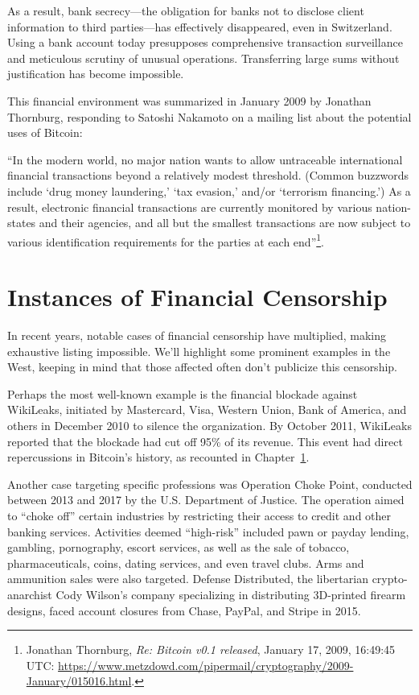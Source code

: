 \documentclass[
  a5paper,
  smalldemyvopaper,10pt,twoside,onecolumn,openright,extrafontsizes,hidelinks]{memoir}
\begin{document}
As a result, bank secrecy---the obligation for banks not to disclose
client information to third parties---has effectively disappeared, even
in Switzerland. Using a bank account today presupposes comprehensive
transaction surveillance and meticulous scrutiny of unusual operations.
Transferring large sums without justification has become impossible.

This financial environment was summarized in January 2009 by Jonathan
Thornburg, responding to Satoshi Nakamoto on a mailing list about the
potential uses of Bitcoin:

``In the modern world, no major nation wants to allow untraceable
international financial transactions beyond a relatively modest
threshold. (Common buzzwords include `drug money laundering,' `tax
evasion,' and/or `terrorism financing.') As a result, electronic
financial transactions are currently monitored by various nation-states
and their agencies, and all but the smallest transactions are now
subject to various identification requirements for the parties at each
end''\footnote{Jonathan Thornburg, \emph{Re: Bitcoin v0.1 released},
  January 17, 2009, 16:49:45 UTC:
  \url{https://www.metzdowd.com/pipermail/cryptography/2009-January/015016.html}.}.

\section*{Instances of Financial
Censorship}\label{les-cas-de-censure-financiuxe8re}


In recent years, notable cases of financial censorship have multiplied,
making exhaustive listing impossible. We'll highlight some prominent
examples in the West, keeping in mind that those affected often don't
publicize this censorship.

Perhaps the most well-known example is the financial blockade against
WikiLeaks, initiated by Mastercard, Visa, Western Union, Bank of
America, and others in December 2010 to silence the organization. By
October 2011, WikiLeaks reported that the blockade had cut off 95\% of
its revenue. This event had direct repercussions in Bitcoin's history,
as recounted in Chapter~\hyperref[ch:mythe]{1}.

Another case targeting specific professions was Operation Choke Point,
conducted between 2013 and 2017 by the U.S. Department of Justice. The
operation aimed to ``choke off'' certain industries by restricting their
access to credit and other banking services. Activities deemed
``high-risk'' included pawn or payday lending, gambling, pornography,
escort services, as well as the sale of tobacco, pharmaceuticals, coins,
dating services, and even travel clubs. Arms and ammunition sales were
also targeted. Defense Distributed, the libertarian crypto-anarchist
Cody Wilson's company specializing in distributing 3D-printed firearm
designs, faced account closures from Chase, PayPal, and Stripe in 2015.
\end{document}
